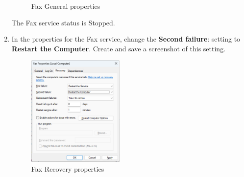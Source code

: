 \documentclass[12pt]{article}
\newenvironment{problem}[2][Problem]{\begin{trivlist}
\item[\hskip \labelsep {\bfseries #1}\hskip \labelsep {\bfseries #2.}]}{\end{trivlist}}
\begin{document}
\begin{problem}{1}
\begin{enumerate}
\begin{figure}[H]
        \caption{Fax General properties}
    \end{figure}
    The Fax service status is Stopped.
    \item In the properties for the Fax service, change the \textbf{Second failure}: setting to \textbf{Restart the Computer}. Create and save a screenshot of this setting. 
    \begin{figure}[H]
        \centering
        \includegraphics[width=0.45\textwidth]{fax_recovery}
        \caption{Fax Recovery properties}
    \end{figure}
\end{enumerate}

\end{problem}
 
\end{document}
